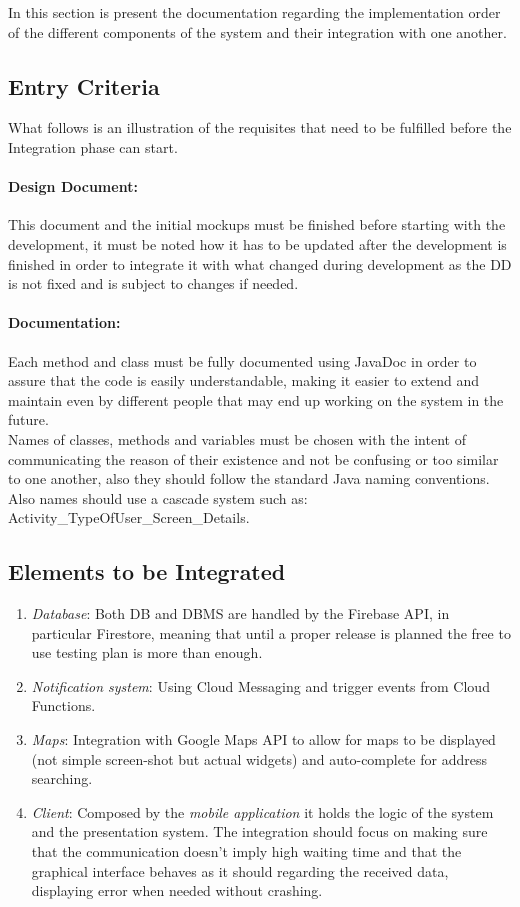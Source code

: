 In this section is present the documentation regarding the implementation order of the different components of the system and their integration with one another.
\subsection{Entry Criteria}
What follows is an illustration of the requisites that need to be fulfilled before the Integration phase can start.
\paragraph*{Design Document:\\} This document and the initial mockups must be finished before starting with the development, it must be noted how it has to be updated after the development is finished in order to integrate it with what changed during development as the DD is not fixed and is subject to changes if needed.
\paragraph*{Documentation:\\} Each method and class must be fully documented using JavaDoc in order to assure that the code is easily understandable, making it easier to extend and maintain even by different people that may end up working on the system in the future.\\
Names of classes, methods and variables must be chosen with the intent of communicating the reason of their existence and not be confusing or too similar to one another, also they should follow the standard Java naming conventions.\\
Also names should use a cascade system such as: Activity\_TypeOfUser\_Screen\_Details.
\subsection{Elements to be Integrated}
\begin{enumerate}
\item \emph{Database}: Both DB and DBMS are handled by the Firebase API, in particular Firestore, meaning that until a proper release is planned the free to use testing plan is more than enough.
\item \emph{Notification system}: Using Cloud Messaging and trigger events from Cloud Functions.
\item \emph{Maps}: Integration with Google Maps API to allow for maps to be displayed (not simple screen-shot but actual widgets) and auto-complete for address searching.
\item \emph{Client}: Composed by the \emph{mobile application} it holds the logic of the system and the presentation system.
The integration should focus on making sure that the communication doesn't imply high waiting time and that the graphical interface behaves as it should regarding the received data, displaying error when needed without crashing.
\end{enumerate}
